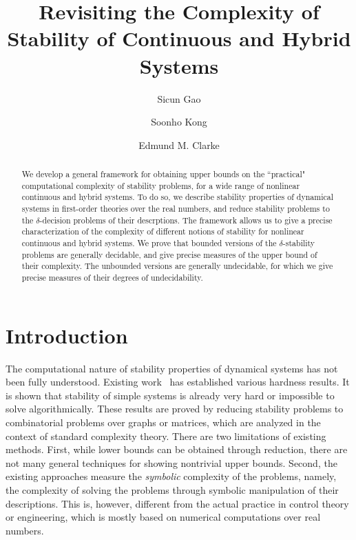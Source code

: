 \documentclass[10pt]{article}
\title{\LARGE \bf Revisiting the Complexity of Stability of Continuous and Hybrid Systems}
\author{Sicun Gao \and Soonho Kong \and Edmund M. Clarke}
\theoremstyle{plain}
\theoremstyle{definition}
\begin{document}
\maketitle
\thispagestyle{empty}
\pagestyle{empty}


\begin{abstract}
We develop a general framework for obtaining upper bounds on the ``practical" computational complexity of stability problems, for a wide range of nonlinear continuous and hybrid systems. To do so, we describe stability properties of dynamical systems in first-order theories over the real numbers, and reduce stability problems to the $\delta$-decision problems of their descrptions. The framework allows us to give a precise characterization of the complexity of different notions of stability for nonlinear continuous and hybrid systems. We prove that bounded versions of the $\delta$-stability problems are generally decidable, and give precise measures of the upper bound of their complexity. The unbounded versions are generally undecidable, for which we give precise measures of their degrees of undecidability. 
\end{abstract}

\section{Introduction}

The computational nature of stability properties of dynamical systems has not been fully understood. Existing work~\cite{DBLP:journals/automatica/BlondelT99,DBLP:journals/automatica/BlondelT00,DBLP:conf/hybrid/PrabhakarV13} has established various hardness results. It is shown that stability of simple systems is already very hard or impossible to solve algorithmically. These results are proved by reducing stability problems to combinatorial problems over graphs or matrices, which are analyzed in the context of standard complexity theory. There are two limitations of existing methods. First, while lower bounds can be obtained through reduction, there are not many general techniques for showing nontrivial upper bounds.  Second, the existing approaches measure the {\em symbolic} complexity of the problems, namely, the complexity of solving the problems through symbolic manipulation of their descriptions. This is, however, different from the actual practice in control theory or engineering, which is mostly based on numerical computations over real numbers. 
\end{document}
